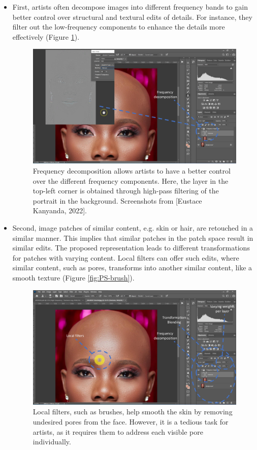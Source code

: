 \begin{itemize}
\item First, artists often decompose images into different frequency bands to gain better control over structural and textural edits of details. For instance, they filter out the low-frequency components to enhance the details more effectively (Figure \ref{fig:PS-high-pass}).

\begin{figure}[ht]
\centering
\includegraphics[width=\columnwidth]{Chapters/detail-retouching-figs/PS1.pdf}
    \caption{Frequency decomposition allows artists to have a better control over the different frequency components. Here, the layer in the top-left corner is obtained through high-pass filtering of the portrait in the background. Screenshots from [Eustace Kanyanda, 2022].}

\label{fig:PS-high-pass}
\end{figure}
\item Second, image patches of similar content, e.g. skin or hair, are retouched in a similar manner. This implies that similar patches in the patch space result in similar edits. The proposed representation leads to different transformations for patches with varying content. Local filters can offer such edits, where similar content, such as pores, transforms into another similar content, like a smooth texture (Figure \ref{fig:PS-brush}).

\begin{figure}[H]
\centering
\includegraphics[width=\columnwidth]{Chapters/detail-retouching-figs/PS3.pdf}
    \caption{Local filters, such as brushes, help smooth the skin by removing undesired pores from the face. However, it is a tedious task for artists, as it requires them to address each visible pore individually.}


\end{figure}
\end{itemize}
